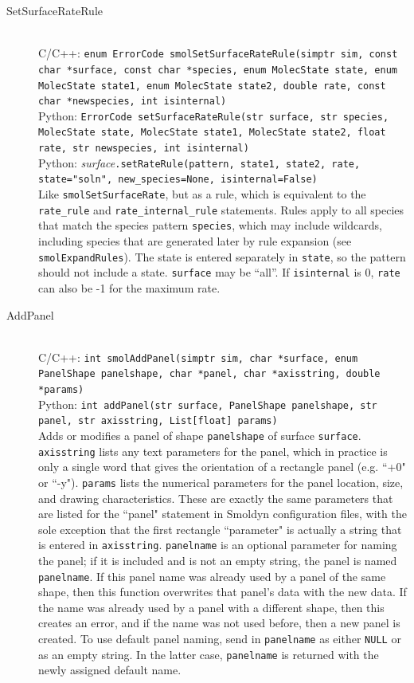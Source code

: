 \documentclass {scrbook}
\newcommand {\ttt} {\texttt}
\begin{document}
\begin{description}
\item[SetSurfaceRateRule]
\hfill \\
C/C++: \ttt{enum ErrorCode smolSetSurfaceRateRule(simptr sim, const char *surface, const char *species, enum MolecState state, enum MolecState state1, enum MolecState state2, double rate, const char *newspecies, int isinternal)}\\
Python: \ttt{ErrorCode setSurfaceRateRule(str surface, str species, MolecState state, MolecState state1, MolecState state2, float rate, str newspecies, int isinternal)}\\
Python: \textit{surface}\ttt{.setRateRule(pattern, state1, state2, rate, state="soln", new\_species=None, isinternal=False)}\\
Like \ttt{smolSetSurfaceRate}, but as a rule, which is equivalent to the \ttt{rate\_rule} and \ttt{rate\_internal\_rule} statements. Rules apply to all species that match the species pattern \ttt{species}, which may include wildcards, including species that are generated later by rule expansion (see \ttt{smolExpandRules}). The state is entered separately in \ttt{state}, so the pattern should not include a state. \ttt{surface} may be ``all''. If \ttt{isinternal} is 0, \ttt{rate} can also be -1 for the maximum rate.

\item[AddPanel]
\hfill \\
C/C++: \ttt{int smolAddPanel(simptr sim, char *surface, enum PanelShape panelshape, char *panel, char *axisstring, double *params)}\\
Python: \ttt{int addPanel(str surface, PanelShape panelshape, str panel, str axisstring, List[float] params)}\\
Adds or modifies a panel of shape \ttt{panelshape} of surface \ttt{surface}. \ttt{axisstring} lists any text parameters for the panel, which in practice is only a single word that gives the orientation of a rectangle panel (e.g. ``+0" or ``-y"). \ttt{params} lists the numerical parameters for the panel location, size, and drawing characteristics. These are exactly the same parameters that are listed for the ``panel" statement in Smoldyn configuration files, with the sole exception that the first rectangle ``parameter" is actually a string that is entered in \ttt{axisstring}. \ttt{panelname} is an optional parameter for naming the panel; if it is included and is not an empty string, the panel is named \ttt{panelname}. If this panel name was already used by a panel of the same shape, then this function overwrites that panel's data with the new data. If the name was already used by a panel with a different shape, then this creates an error, and if the name was not used before, then a new panel is created. To use default panel naming, send in \ttt{panelname} as either \ttt{NULL} or as an empty string. In the latter case, \ttt{panelname} is returned with the newly assigned default name.


\end{description}
\end{document}
